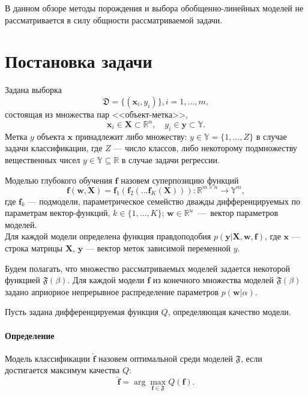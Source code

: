 \documentclass{article}
\begin{document}
В данном обзоре методы порождения и выбора обобщенно-линейных моделей не рассматривается в силу общности рассматриваемой задачи. 

\section{Постановка задачи}
Задана выборка  \begin{equation}\label{eq:dataset}\mathfrak{D} = \{(\mathbf{x}_i,y_i)\}, i = 1,\dots,m,\end{equation} состоящая из множества пар <<объект-метка>>, $$\mathbf{x}_i \in \mathbf{X} \subset \mathbb{R}^n, \quad {y}_i \in \mathbf{y} \subset \mathbb{Y}.$$ Метка ${y}$  объекта $\mathbf{x}$ принадлежит либо множеству: ${y} \in \mathbb{Y} = \{1, \dots, Z\}$ в случае задачи классификации, где $Z$ --- число классов, либо некоторому подмножеству вещественных чисел ${y} \in \mathbb{Y}  \subseteq \mathbb{R}$ в случае задачи регрессии.

Моделью глубокого обучения $\mathbf{f}$ назовем суперпозицию функций
\begin{equation}
\label{eq:main}
 \mathbf{f}(\mathbf{w}, \mathbf{X}) = \mathbf{f}_1(\mathbf{f}_2(\dots \mathbf{f}_K( \mathbf{X}))): \mathbb{R}^{m \times n} \to \mathbb{Y}^m,
\end{equation}
где $\mathbf{f}_k$ --- подмодели, параметрическое семейство дважды дифференцируемых по параметрам вектор-функций, $k \in \{1,\dots,K\}$; $\mathbf{w} \in \mathbb{R}^u$~---~вектор параметров моделей.\\

Для каждой модели определена функция правдоподобия  $p(\mathbf{y}|\mathbf{X}, \mathbf{w}, \mathbf{f})$, где $\mathbf{x}$ --- строка матрицы $\mathbf{X}$, $\mathbf{y}$ --- вектор меток зависимой переменной $y$.

Будем полагать, что множество рассматриваемых моделей задается некоторой функцией  $\mathfrak{F}(\beta)$. Для каждой модели $\mathbf{f}$ из конечного множества моделей $\mathfrak{F}(\beta)$ задано априорное непрерывное распределение параметров $p(\mathbf{w}|\alpha)$. 


Пусть задана дифференцируемая функция $Q$, определяющая качество модели.


\paragraph{Определение }Модель классификации $\hat{\mathbf{f}}$ назовем оптимальной среди моделей $\mathfrak{F}$, если достигается максимум качества $Q$:
    $$
        \hat{\mathbf{f}}  = \arg\max_{\mathbf{f} \in \mathfrak{F}} Q(\mathbf{f}).
    $$
\end{document}
